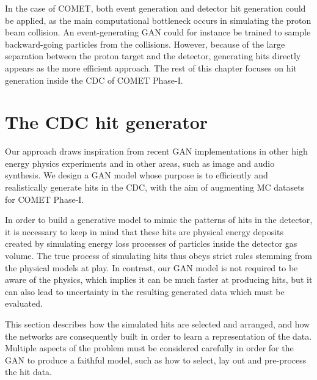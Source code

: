 In the case of COMET, both event generation and detector hit generation could be applied, as the main computational bottleneck occurs in simulating the proton beam collision. An event-generating GAN could for instance be trained to sample backward-going particles from the collisions. However, because of the large separation between the proton target and the detector, generating hits directly appears as the more efficient approach.
The rest of this chapter focuses on hit generation inside the CDC of COMET Phase-I.





\section{The CDC hit generator}
Our approach draws inspiration from recent GAN implementations in other high energy physics experiments and in other areas, such as image and audio synthesis. We design a GAN model whose purpose is to efficiently and realistically generate hits in the CDC, with the aim of augmenting MC datasets for COMET Phase-I. 

In order to build a generative model to mimic the patterns of hits in the detector, it is necessary to keep in mind that these hits are physical energy deposits created by simulating energy loss processes of particles inside the detector gas volume. The true process of simulating hits thus obeys strict rules stemming from the physical models at play. In contrast, our GAN model is not required to be aware of the physics, which implies it can be much faster at producing hits, but it can also lead to uncertainty in the resulting generated data which must be evaluated.

This section describes how the simulated hits are selected and arranged, and how the networks are consequently built in order to learn a representation of the data. Multiple aspects of the problem must be considered carefully in order for the GAN to produce a faithful model, such as how to select, lay out and pre-process the hit data.


